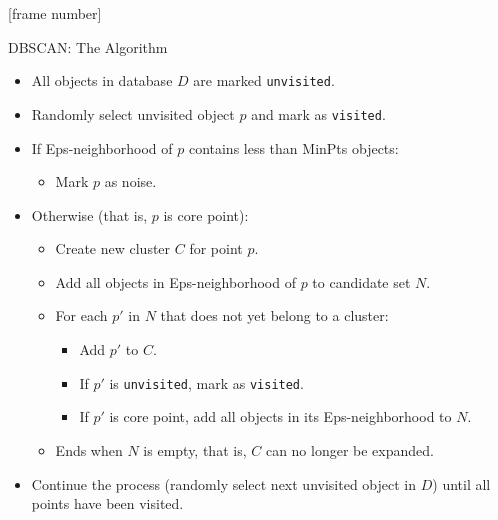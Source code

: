 \documentclass[aspectratio=169,t,xcolor=dvipsnames]{beamer}
\begin{document}
  {
    [frame number]
    \begin{frame}{DBSCAN: The Algorithm}
      \begin{itemize}
        \item All objects in database $D$ are marked \texttt{unvisited}.
        \item Randomly select unvisited object $p$ and mark as \texttt{visited}.
        \item If Eps-neighborhood of $p$ contains less than MinPts objects:
        \begin{itemize}
          \item Mark $p$ as noise.
        \end{itemize}
        \item Otherwise (that is, $p$ is core point):
        \begin{itemize}
          \item Create new cluster $C$ for point $p$.
          \item Add all objects in Eps-neighborhood of $p$ to candidate set $N$.
          \item For each $p'$ in $N$ that does not yet belong to a cluster:
          \begin{itemize}
            \item Add $p'$ to $C$.
            \item If $p'$ is \texttt{unvisited}, mark as \texttt{visited}.
            \item If $p'$ is core point, add all objects in its Eps-neighborhood to $N$.
          \end{itemize}
          \item Ends when $N$ is empty, that is, $C$ can no longer be expanded.
        \end{itemize}
        \item Continue the process (randomly select next unvisited object in $D$) until all points have been visited.
      \end{itemize}
    \end{frame}
  }
\end{document}
